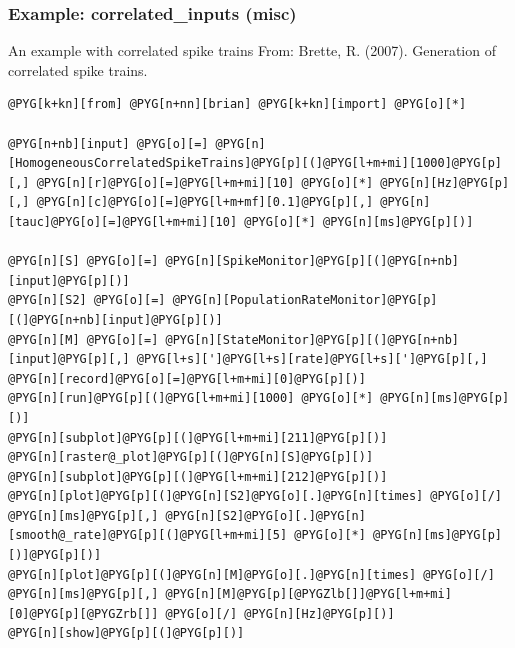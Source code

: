 \documentclass[letterpaper,10pt,english]{manual}
\begin{document}
\resetcurrentobjects
\hypertarget{--doc-examples-misc_correlated_inputs}{}

\hypertarget{index-44}{}\subsubsection{Example: correlated\_inputs (misc)}

An example with correlated spike trains
From: Brette, R. (2007). Generation of correlated spike trains.

\begin{Verbatim}[commandchars=@\[\]]
@PYG[k+kn][from] @PYG[n+nn][brian] @PYG[k+kn][import] @PYG[o][*]

@PYG[n+nb][input] @PYG[o][=] @PYG[n][HomogeneousCorrelatedSpikeTrains]@PYG[p][(]@PYG[l+m+mi][1000]@PYG[p][,] @PYG[n][r]@PYG[o][=]@PYG[l+m+mi][10] @PYG[o][*] @PYG[n][Hz]@PYG[p][,] @PYG[n][c]@PYG[o][=]@PYG[l+m+mf][0.1]@PYG[p][,] @PYG[n][tauc]@PYG[o][=]@PYG[l+m+mi][10] @PYG[o][*] @PYG[n][ms]@PYG[p][)]

@PYG[n][S] @PYG[o][=] @PYG[n][SpikeMonitor]@PYG[p][(]@PYG[n+nb][input]@PYG[p][)]
@PYG[n][S2] @PYG[o][=] @PYG[n][PopulationRateMonitor]@PYG[p][(]@PYG[n+nb][input]@PYG[p][)]
@PYG[n][M] @PYG[o][=] @PYG[n][StateMonitor]@PYG[p][(]@PYG[n+nb][input]@PYG[p][,] @PYG[l+s][']@PYG[l+s][rate]@PYG[l+s][']@PYG[p][,] @PYG[n][record]@PYG[o][=]@PYG[l+m+mi][0]@PYG[p][)]
@PYG[n][run]@PYG[p][(]@PYG[l+m+mi][1000] @PYG[o][*] @PYG[n][ms]@PYG[p][)]
@PYG[n][subplot]@PYG[p][(]@PYG[l+m+mi][211]@PYG[p][)]
@PYG[n][raster@_plot]@PYG[p][(]@PYG[n][S]@PYG[p][)]
@PYG[n][subplot]@PYG[p][(]@PYG[l+m+mi][212]@PYG[p][)]
@PYG[n][plot]@PYG[p][(]@PYG[n][S2]@PYG[o][.]@PYG[n][times] @PYG[o][/] @PYG[n][ms]@PYG[p][,] @PYG[n][S2]@PYG[o][.]@PYG[n][smooth@_rate]@PYG[p][(]@PYG[l+m+mi][5] @PYG[o][*] @PYG[n][ms]@PYG[p][)]@PYG[p][)]
@PYG[n][plot]@PYG[p][(]@PYG[n][M]@PYG[o][.]@PYG[n][times] @PYG[o][/] @PYG[n][ms]@PYG[p][,] @PYG[n][M]@PYG[p][@PYGZlb[]]@PYG[l+m+mi][0]@PYG[p][@PYGZrb[]] @PYG[o][/] @PYG[n][Hz]@PYG[p][)]
@PYG[n][show]@PYG[p][(]@PYG[p][)]
\end{Verbatim}

\resetcurrentobjects
\hypertarget{--doc-examples-misc_CUBA}{}
\end{document}
